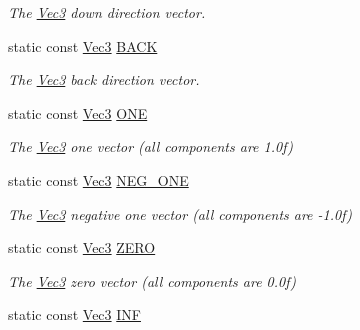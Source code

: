 \begin{DoxyCompactItemize}
\begin{DoxyCompactList}\small\item\em The \hyperlink{classgfxmath_1_1_vec3}{Vec3} down direction vector. \end{DoxyCompactList}\item 
\hypertarget{classgfxmath_1_1_vec3_a3abbcd22a86f239d8345bdcc0654fe70}{}static const \hyperlink{classgfxmath_1_1_vec3}{Vec3} \hyperlink{classgfxmath_1_1_vec3_a3abbcd22a86f239d8345bdcc0654fe70}{B\+A\+C\+K}\label{classgfxmath_1_1_vec3_a3abbcd22a86f239d8345bdcc0654fe70}

\begin{DoxyCompactList}\small\item\em The \hyperlink{classgfxmath_1_1_vec3}{Vec3} back direction vector. \end{DoxyCompactList}\item 
\hypertarget{classgfxmath_1_1_vec3_a66f3e0f49832d21f3ad8e59f3b0a5596}{}static const \hyperlink{classgfxmath_1_1_vec3}{Vec3} \hyperlink{classgfxmath_1_1_vec3_a66f3e0f49832d21f3ad8e59f3b0a5596}{O\+N\+E}\label{classgfxmath_1_1_vec3_a66f3e0f49832d21f3ad8e59f3b0a5596}

\begin{DoxyCompactList}\small\item\em The \hyperlink{classgfxmath_1_1_vec3}{Vec3} one vector (all components are 1.\+0f) \end{DoxyCompactList}\item 
\hypertarget{classgfxmath_1_1_vec3_aef5d6a224bc9f3b5cedda2a250330623}{}static const \hyperlink{classgfxmath_1_1_vec3}{Vec3} \hyperlink{classgfxmath_1_1_vec3_aef5d6a224bc9f3b5cedda2a250330623}{N\+E\+G\+\_\+\+O\+N\+E}\label{classgfxmath_1_1_vec3_aef5d6a224bc9f3b5cedda2a250330623}

\begin{DoxyCompactList}\small\item\em The \hyperlink{classgfxmath_1_1_vec3}{Vec3} negative one vector (all components are -\/1.\+0f) \end{DoxyCompactList}\item 
\hypertarget{classgfxmath_1_1_vec3_a118efe8c1f3e2b270d623a0743bbab89}{}static const \hyperlink{classgfxmath_1_1_vec3}{Vec3} \hyperlink{classgfxmath_1_1_vec3_a118efe8c1f3e2b270d623a0743bbab89}{Z\+E\+R\+O}\label{classgfxmath_1_1_vec3_a118efe8c1f3e2b270d623a0743bbab89}

\begin{DoxyCompactList}\small\item\em The \hyperlink{classgfxmath_1_1_vec3}{Vec3} zero vector (all components are 0.\+0f) \end{DoxyCompactList}\item 
\hypertarget{classgfxmath_1_1_vec3_adc0a8e147d92f5f00ed8a6f4dc3978d5}{}static const \hyperlink{classgfxmath_1_1_vec3}{Vec3} \hyperlink{classgfxmath_1_1_vec3_adc0a8e147d92f5f00ed8a6f4dc3978d5}{I\+N\+F}\label{classgfxmath_1_1_vec3_adc0a8e147d92f5f00ed8a6f4dc3978d5}


\end{DoxyCompactItemize}
